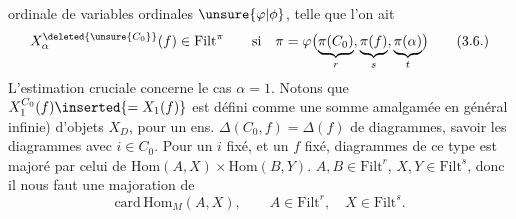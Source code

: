 ordinale de variables ordinales $\unsure{\varphi|\phi}$, telle que l'on ait
\[
X_\alpha^{\deleted{\unsure{C_0}}}(f)\in\mathrm{Filt}^{\pi}\qquad\text{si}\quad
\pi=\varphi\bigl(\underbrace{\pi(C_0)}_r,\underbrace{\pi(f)}_s,\underbrace{\pi(\alpha)}_t\bigr)
\tag*{(3.6.)}
\]
L'estimation cruciale concerne  le cas $\alpha=1$.
Notons que $X_1^{C_0}(f)\inserted{=X_1(f)}$ est défini comme une somme amalgamée  \unsure{(}en général infinie) d'objets $X_D$, pour un ens. $\Delta(C_0,f)=\Delta(f)$ de diagrammes, savoir les diagrammes 
avec $i\in C_0$. Pour un  $i$ fixé, et un $f$ fixé,   diagrammes de ce type est majoré par celui de $\mathrm{Hom}(A,X)\times\mathrm{Hom}(B,Y)$.  $A,B\in\mathrm{Filt}^r$, $X,Y\in\mathrm{Filt}^s$, donc il nous faut une majoration de
\[
\mathrm{card}\,\mathrm{Hom}_M(A,X),\qquad A\in\mathrm{Filt}^r,\quad X\in\mathrm{Filt}^s.
\]

